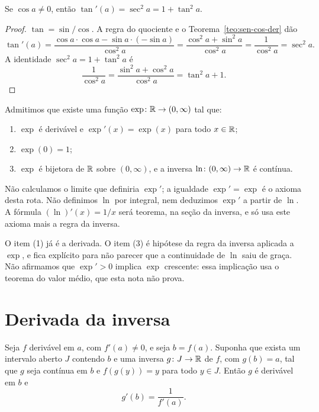 \documentclass[11pt,a4paper]{article}
\begin{document}
\begin{teorema}
\label{teo:tan}
Se $\cos a\neq 0$, ent\~ao $\tan'(a)=\sec^2 a=1+\tan^2 a$.
\end{teorema}

\begin{proof}
$\tan=\sin/\cos$. A regra do quociente e o Teorema~\ref{teo:sen-cos-der} d\~ao
\[
\tan'(a)=\frac{\cos a\cdot\cos a-\sin a\cdot(-\sin a)}{\cos^2 a}=\frac{\cos^2 a+\sin^2 a}{\cos^2 a}=\frac{1}{\cos^2 a}=\sec^2 a.
\]
A identidade $\sec^2 a=1+\tan^2 a$ \'e
\[
\frac{1}{\cos^2 a}=\frac{\sin^2 a+\cos^2 a}{\cos^2 a}=\tan^2 a+1.
\]
\end{proof}

\begin{teorema}
\label{teo:exp}
Admitimos que existe uma fun\c{c}\~ao $\exp\colon\mathbb{R}\to(0,\infty)$ tal que:
\begin{enumerate}
\item $\exp$ \'e deriv\'avel e $\exp'(x)=\exp(x)$ para todo $x\in\mathbb{R}$;
\item $\exp(0)=1$;
\item $\exp$ \'e bijetora de $\mathbb{R}$ sobre $(0,\infty)$, e a inversa $\ln\colon(0,\infty)\to\mathbb{R}$ \'e cont\'inua.
\end{enumerate}
N\~ao calculamos o limite que definiria $\exp'$; a igualdade $\exp'=\exp$ \'e o axioma desta rota. N\~ao definimos $\ln$ por integral, nem deduzimos $\exp'$ a partir de $\ln$. A f\'ormula $(\ln)'(x)=1/x$ ser\'a teorema, na se\c{c}\~ao da inversa, e s\'o usa este axioma mais a regra da inversa.
\end{teorema}

O item (1) j\'a \'e a derivada. O item (3) \'e hip\'otese da regra da inversa aplicada a $\exp$, e fica expl\'icito para n\~ao parecer que a continuidade de $\ln$ saiu de gra\c{c}a. N\~ao afirmamos que $\exp'>0$ implica $\exp$ crescente: essa implica\c{c}\~ao usa o teorema do valor m\'edio, que esta nota n\~ao prova.

\section{Derivada da inversa}
\label{sec:inversa}

\begin{teorema}
\label{teo:inversa}
Seja $f$ deriv\'avel em $a$, com $f'(a)\neq 0$, e seja $b=f(a)$. Suponha que exista um intervalo aberto $J$ contendo $b$ e uma inversa $g\colon J\to\mathbb{R}$ de $f$, com $g(b)=a$, tal que $g$ seja cont\'inua em $b$ e $f(g(y))=y$ para todo $y\in J$. Ent\~ao $g$ \'e deriv\'avel em $b$ e
\[
g'(b)=\frac{1}{f'(a)}.
\]
\end{teorema}
\end{document}
